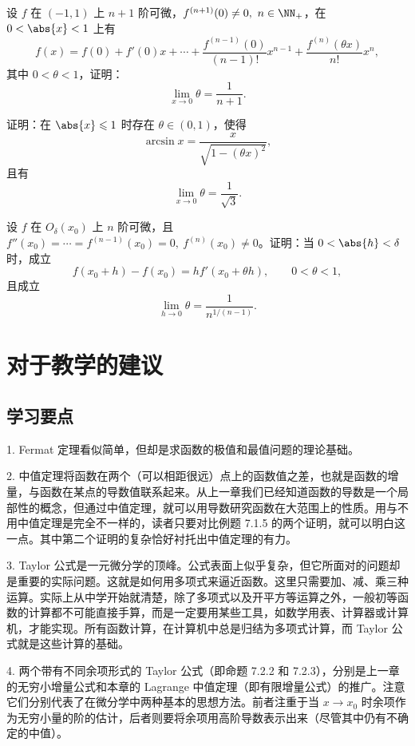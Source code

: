 \begin{xexercise}[14]
设 $f$ 在 $(-1,1)$ 上 $n+1$ 阶可微，$f^{(n+1)}(0)\neq0,\ n\in\NN_+$，在 $0<\abs{x}<1$ 上有
\[
  f(x)=f(0)+f'(0)x+\cdots+\frac{f^{(n-1)}(0)}{(n-1)!}x^{n-1}+\frac{f^{(n)}(\theta x)}{n!}x^n,
\]
其中 $0<\theta<1$，证明：
\[
  \lim_{x\to0}\theta=\frac{1}{n+1}.
\]
\end{xexercise}

\begin{xexercise}[15]
证明：在 $\abs{x}\leqslant1$ 时存在 $\theta\in(0,1)$，使得
\[
  \arcsin x=\frac{x}{\sqrt{1-(\theta x)^2}},
\]
且有
\[
  \lim_{x\to0}\theta=\frac{1}{\sqrt3}.
\]
\end{xexercise}

\begin{xexercise}[16]
设 $f$ 在 $O_\delta(x_0)$ 上 $n$ 阶可微，且 $f''(x_0)=\cdots=f^{(n-1)}(x_0)=0,\ f^{(n)}(x_0)\neq0$。证明：当 $0<\abs{h}<\delta$ 时，成立
\[
  f(x_0+h)-f(x_0)=hf'(x_0+\theta h),\qquad0<\theta<1,
\]
且成立
\[
  \lim_{h\to0}\theta=\frac{1}{n^{1/(n-1)}}.
\]
\end{xexercise}

\section{对于教学的建议}

\subsection{学习要点}

1. Fermat 定理看似简单，但却是求函数的极值和最值问题的理论基础。

2. 中值定理将函数在两个（可以相距很远）点上的函数值之差，也就是函数的增量，与函数在某点的导数值联系起来。从上一章我们已经知道函数的导数是一个局部性的概念，但通过中值定理，就可以用导数研究函数在大范围上的性质。用与不用中值定理是完全不一样的，读者只要对比例题 7.1.5 的两个证明，就可以明白这一点。其中第二个证明的复杂恰好衬托出中值定理的有力。

3. Taylor 公式是一元微分学的顶峰。公式表面上似乎复杂，但它所面对的问题却是重要的实际问题。这就是如何用多项式来逼近函数。这里只需要加、减、乘三种运算。实际上从中学开始就清楚，除了多项式以及开平方等运算之外，一般初等函数的计算都不可能直接手算，而是一定要用某些工具，如数学用表、计算器或计算机，才能实现。所有函数计算，在计算机中总是归结为多项式计算，而 Taylor 公式就是这些计算的基础。

4. 两个带有不同余项形式的 Taylor 公式（即命题 7.2.2 和 7.2.3），分别是上一章的无穷小增量公式和本章的 Lagrange 中值定理（即有限增量公式）的推广。注意它们分别代表了在微分学中两种基本的思想方法。前者注重于当 $x\to x_0$ 时余项作为无穷小量的阶的估计，后者则要将余项用高阶导数表示出来（尽管其中仍有不确定的中值）。


